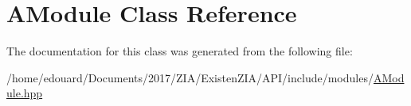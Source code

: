 \hypertarget{classAModule}{}\section{A\+Module Class Reference}
\label{classAModule}


The documentation for this class was generated from the following file\+:\begin{DoxyCompactItemize}
\item 
/home/edouard/\+Documents/2017/\+Z\+I\+A/\+Existen\+Z\+I\+A/\+A\+P\+I/include/modules/\mbox{\hyperlink{AModule_8hpp}{A\+Module.\+hpp}}\end{DoxyCompactItemize}

